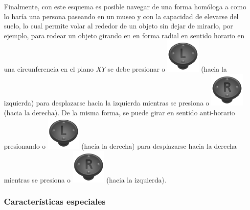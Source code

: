 Finalmente, con este esquema es posible navegar de una forma homóloga a como lo haría una persona paseando en un museo y con la capacidad de elevarse del suelo, lo cual permite volar al rededor de un objeto sin dejar de mirarlo, por ejemplo, para rodear un objeto girando en en forma radial en sentido horario en una circunferencia en el plano $XY$ se debe presionar  o \includegraphics[scale=0.4, trim= 0 20 0 0]{images/visualizer/xbox360/leftStick.png} (hacia la izquierda) para desplazarse hacia la izquierda mientras se presiona \keystroke{$\rightarrow$} o \includegraphics[scale=0.4, trim= 0 20 0 0]{images/visualizer/xbox360/rightStick.png} (hacia la derecha). De la misma forma, se puede girar en sentido anti-horario presionando  o \includegraphics[scale=0.4, trim= 0 20 0 0]{images/visualizer/xbox360/leftStick.png} (hacia la derecha) para desplazarse hacia la derecha mientras se presiona \keystroke{$\leftarrow$} o \includegraphics[scale=0.4, trim= 0 20 0 0]{images/visualizer/xbox360/rightStick.png} (hacia la izquierda).

\subsubsection{Características especiales}
\label{ch:propuesta:sec:extraccionDeLaSuperficie:subsec:caracteristicasEspeciales}

